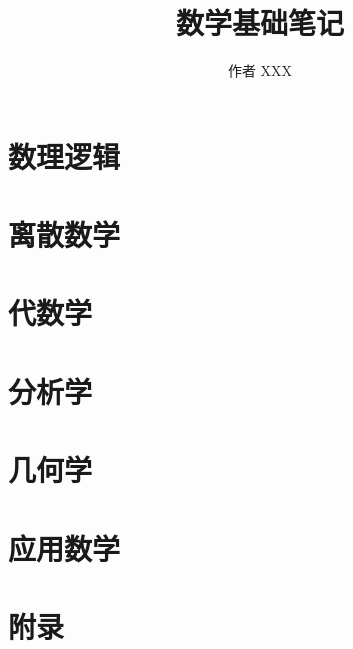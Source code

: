 



\makeindex
\title{数学基础笔记}
\author{作者 XXX}


\frontmatter



\tableofcontents

\mainmatter
\part{数理逻辑}


\part{离散数学}


\part{代数学}

\part{分析学}

\part{几何学}

\part{应用数学}

\part{附录}
\appendix



\backmatter

\printindex

